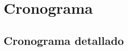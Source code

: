 \chapter{Cronograma}
\section{Cronograma detallado}

\begin{comment}
\section{Modelo de control}
El diseño fue abordado de manera que a partir de la medición de corriente entregada a la carga se obtenga la referencia de tensión usando el
modelo de tensión de la pila de combustible. A su vez, esta referencia se utilizará como \emph{set-point} del PI de tensión implementado
anteriormente para el convertidor reductor. Por otra parte el modelo del convertidor reductor ha sido modificado levemente permitiéndole
conducir en sentido opuesto a corrientes de carga muy bajas y posibilitar así su funcionamiento permanente en modo de conducción continua, incluso
a corrientes de carga muy bajas. Esto es posible gracias a que las llaves de conmutación utilizadas son bidireccionales. Operar el convertidor
en modo de conducción continua permite mejorar la resolución del emulador a bajas corrientes.

El esquema del modelo de simulación general es el de la figura \ref{fig:esquema_control}.

\begin{figure}[H]
  \centering
  \texttt{[image: gfx/esquema\_control.eps]}
  \caption{Esquema general de control}
  \label{fig:esquema_control}
\end{figure}

\subsection{Filtro de corriente}
Conforme a la estructura presentada en la fig. \ref{fig:esquema_control} y guardando cierta analogía con del diseño el modelo de control utilizado para el
elevador (fig. \ref{fig:modelo_elevador}), nuevamente se hace necesario el uso de un filtro de corriente que rechace las componentes de frecuencia generadas
por el PWM.


\end{comment}

